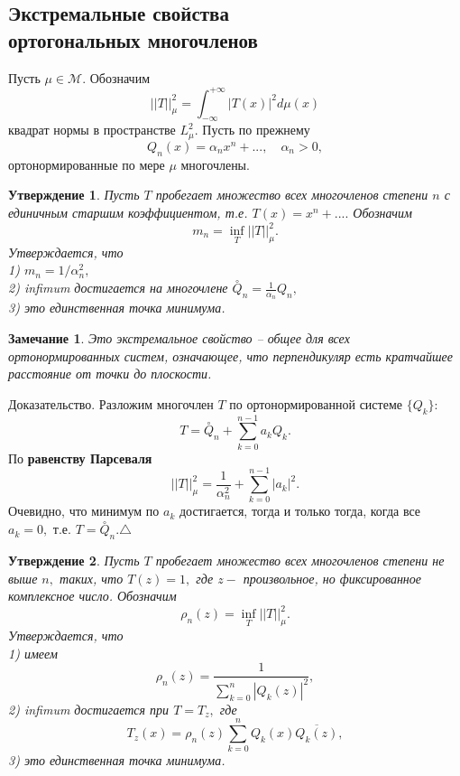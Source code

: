 \documentclass[12 pt, a4 paper]{article}
\theoremstyle{plain}   \newtheorem{Pro}{Задача}
\newtheorem{Sta}{Утверждение}
\newtheorem{Rem}{Замечание}
\begin{document}
\subsection{Экстремальные свойства \\
ортогональных многочленов}
$ \; $
\\
Пусть
$ \mu \in \mathcal{M}. $
Обозначим
$$
  ||T||_{\mu}^2 =\int _{-\infty}^{+\infty}
  |T(x)|^2 d\mu (x)
$$
квадрат нормы в пространстве
$ L_{\mu}^2 . $
Пусть по прежнему
$$
  Q_n (x)=\alpha _n x^n +... , \quad
  \alpha _n >0,
$$
ортонормированные по мере
$ \mu $
многочлены.
\begin{Sta}
Пусть
$ T $
пробегает множество всех многочленов степени
$ n $
с единичным старшим коэффициентом, т.е.
$ T(x)=x^n +.... $
Обозначим
$$
  m_n = \inf _T ||T||_{\mu}^2 .
$$
Утверждается, что
\\
1) $ m_n =1/\alpha _n ^2 , $
\\
2) infimum достигается на многочлене
$ \overset{\circ}{Q}_n = \frac{1}{\alpha _n}Q_n , $
\\
3) это единственная точка минимума.
\end{Sta}
\begin{Rem}
Это экстремальное свойство -- общее для всех ортонормированных
систем, означающее, что перпендикуляр есть кратчайшее расстояние
от точки до плоскости.
\end{Rem}
{\Large Доказательство.}
Разложим многочлен
$ T $
по ортонормированной системе
$ \{ Q_k \} : $
$$
  T=\overset{\circ}{Q}_n+\sum _{k=0}^{n-1}a_k Q_k .
$$
По
{\bfseries равенству Парсеваля}
$$
  ||T||_{\mu}^2 =\frac{1}{\alpha _n ^2 }+\sum _{k=0}^{n-1}|a_k|^2 .
$$
Очевидно, что минимум по
$ a_k $
достигается, тогда и только тогда, когда все
$ a_k =0 , $
т.е.
$ T=\overset {\circ}{Q}_n . \triangle $
\begin{Sta}
Пусть
$ T $
пробегает множество всех многочленов степени не выше
$ n , $
таких, что
$ T(z)=1 , $
где
$ z - $
произвольное, но фиксированное комплексное число.
Обозначим
$$
  \rho _n (z)=\inf _T ||T||_{\mu}^2 .
$$
Утверждается, что
\\
1) имеем
$$
  \rho _n (z)=\frac{1}
  {\sum _{k=0}^n |Q_k (z)|^2},
$$
2) infimum достигается при
$ T=T_z , $
где
$$
  T_z (x)=\rho _n (z) \sum _{k=0}^n Q_k (x) \overline {Q_k (z)},
$$
3) это единственная точка минимума.
\end{Sta}
\end{document}
